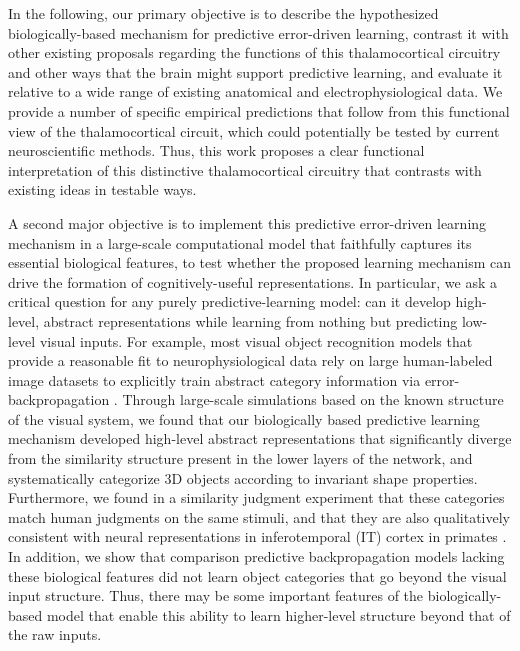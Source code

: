 \documentclass[11pt,twoside]{article}
\newif\myifpdf
\begin{document}
In the following, our primary objective is to describe the hypothesized biologically-based mechanism for predictive error-driven learning, contrast it with other existing proposals regarding the functions of this thalamocortical circuitry and other ways that the brain might support predictive learning, and evaluate it relative to a wide range of existing anatomical and electrophysiological data.  We provide a number of specific empirical predictions that follow from this functional view of the thalamocortical circuit, which could potentially be tested by current neuroscientific methods.  Thus, this work proposes a clear functional interpretation of this distinctive thalamocortical circuitry that contrasts with existing ideas in testable ways. 

A second major objective is to implement this predictive error-driven learning mechanism in a large-scale computational model that faithfully captures its essential biological features, to test whether the proposed learning mechanism can drive the formation of cognitively-useful representations.  In particular, we ask a critical question for any purely predictive-learning model: can it develop high-level, abstract representations while learning from nothing but predicting low-level visual inputs.  For example, most visual object recognition models that provide a reasonable fit to neurophysiological data rely on large human-labeled image datasets to explicitly train abstract category information via error-backpropagation \citep{CadieuHongYaminsEtAl14,Khaligh-RazaviKriegeskorte14,RajalinghamIssaBashivanEtAl18}.  Through large-scale simulations based on the known structure of the visual system, we found that our biologically based predictive learning mechanism developed high-level abstract representations that significantly diverge from the similarity structure present in the lower layers of the network, and systematically categorize 3D objects according to invariant shape properties.  Furthermore, we found in a similarity judgment experiment that these categories match human judgments on the same stimuli, and that they are also qualitatively consistent with neural representations in inferotemporal (IT) cortex in primates \citep{CadieuHongYaminsEtAl14}.  In addition, we show that comparison predictive backpropagation models lacking these biological features \citep{LotterKreimanCox16} did not learn object categories that go beyond the visual input structure.  Thus, there may be some important features of the biologically-based model that enable this ability to learn higher-level structure beyond that of the raw inputs.
\end{document}
